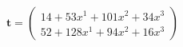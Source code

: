 \documentclass[preview]{standalone}
\begin{document}
\begin{align*}
\mathbf{t} = \begin{pmatrix}14 + 53x^{1} + 101x^{2} + 34x^{3} \\ 52 + 128x^{1} + 94x^{2} + 16x^{3}\end{pmatrix}
\end{align*}
\end{document}
